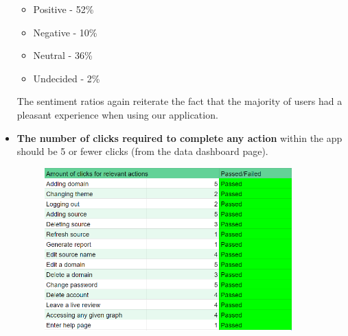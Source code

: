 \documentclass[12pt]{article}
\begin{document}
\begin{itemize}
          \begin{itemize}
              \item Positive - 52\%
              \item Negative - 10\%
              \item Neutral - 36\%
              \item Undecided - 2\%
          \end{itemize}
          The sentiment ratios again reiterate the fact that the majority of users had a pleasant experience when using our application.
          

    \item \textbf{The number of clicks required to complete any action} within the app should be 5 or fewer clicks (from the data dashboard page).
          \begin{figure}[H]
              \centering
              \includegraphics[width=0.9\textwidth]{table2.png}
          \end{figure}
\end{itemize}
\end{document}
